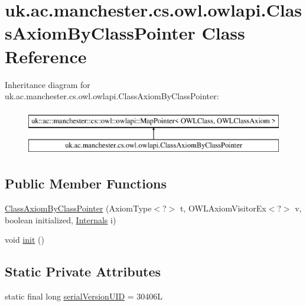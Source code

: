 \hypertarget{classuk_1_1ac_1_1manchester_1_1cs_1_1owl_1_1owlapi_1_1_class_axiom_by_class_pointer}{\section{uk.\-ac.\-manchester.\-cs.\-owl.\-owlapi.\-Class\-Axiom\-By\-Class\-Pointer Class Reference}
\label{classuk_1_1ac_1_1manchester_1_1cs_1_1owl_1_1owlapi_1_1_class_axiom_by_class_pointer}
}
Inheritance diagram for uk.\-ac.\-manchester.\-cs.\-owl.\-owlapi.\-Class\-Axiom\-By\-Class\-Pointer\-:\begin{figure}[H]
\begin{center}
\leavevmode
\includegraphics[height=2.000000cm]{classuk_1_1ac_1_1manchester_1_1cs_1_1owl_1_1owlapi_1_1_class_axiom_by_class_pointer}
\end{center}
\end{figure}
\subsection*{Public Member Functions}
\begin{DoxyCompactItemize}
\item 
\hyperlink{classuk_1_1ac_1_1manchester_1_1cs_1_1owl_1_1owlapi_1_1_class_axiom_by_class_pointer_a94c9a579f0a0bbef517a2a4bd196032c}{Class\-Axiom\-By\-Class\-Pointer} (Axiom\-Type$<$?$>$ t, O\-W\-L\-Axiom\-Visitor\-Ex$<$?$>$ v, boolean initialized, \hyperlink{interfaceuk_1_1ac_1_1manchester_1_1cs_1_1owl_1_1owlapi_1_1_internals}{Internals} i)
\item 
void \hyperlink{classuk_1_1ac_1_1manchester_1_1cs_1_1owl_1_1owlapi_1_1_class_axiom_by_class_pointer_a2d65fb1568686bae40b09e03fd39eaef}{init} ()
\end{DoxyCompactItemize}
\subsection*{Static Private Attributes}
\begin{DoxyCompactItemize}
\item 
static final long \hyperlink{classuk_1_1ac_1_1manchester_1_1cs_1_1owl_1_1owlapi_1_1_class_axiom_by_class_pointer_a4d71d0640de32ef58ea38c20320fe23e}{serial\-Version\-U\-I\-D} = 30406\-L
\end{DoxyCompactItemize}


